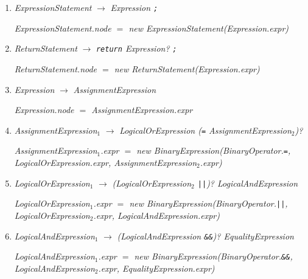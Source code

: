 \documentclass[12pt,a4paper]{scrartcl}
\renewcommand{\prod}[2]{\textit{#1} $\rightarrow$ \textit{#2}}
\newcommand{\tok}[1]{\textnormal{\texttt{#1}}}
\newcommand{\assign}[2]{\textit{#1} $=$ #2}
\newcommand{\new}[2]{\textnormal{new #1(\textit{#2})}}
\newcommand{\attr}[1]{\parbox{\linewidth}{\raggedleft \textit{#1}}}
\begin{document}
\begin{enumerate}
        \attr{\assign{IfStatement.node}{\new{IfStatement}{Expression.expr, \\Statement$_1$.node, Statement$_2$.node}}}
    \item \prod{ExpressionStatement}{Expression \tok{;}}\\
        \attr{\assign{ExpressionStatement.node}{\new{ExpressionStatement}{Expression.expr}}}
    \item \prod{ReturnStatement}{\tok{return} Expression? \tok{;}}\\
        \attr{\assign{ReturnStatement.node}{\new{ReturnStatement}{Expression.expr}}}
    \item \prod{Expression}{AssignmentExpression}\\
        \attr{\assign{Expression.node}{AssignmentExpression.expr}}
    \item \prod{AssignmentExpression$_1$}{LogicalOrExpression (\tok{=} AssignmentExpression$_2$)?}\\
        \attr{\assign{AssignmentExpression$_1$.expr}{\new{BinaryExpression}{BinaryOperator.\tok{=}, LogicalOrExpression.expr, AssignmentExpression$_2$.expr}}}
    \item \prod{LogicalOrExpression$_1$}{(LogicalOrExpression$_2$ \tok{||})? LogicalAndExpression}\\
        \attr{\assign{LogicalOrExpression$_1$.expr}{\new{BinaryExpression}{BinaryOperator.\tok{||}, LogicalOrExpression$_2$.expr, LogicalAndExpression.expr}}}
    \item \prod{LogicalAndExpression$_1$}{(LogicalAndExpression \tok{\&\&})? EqualityExpression}\\
        \attr{\assign{LogicalAndExpression$_1$.expr}{\new{BinaryExpression}{BinaryOperator.\tok{\&\&}, LogicalAndExpression$_2$.expr, EqualityExpression.expr}}}


\end{enumerate}
\end{document}
